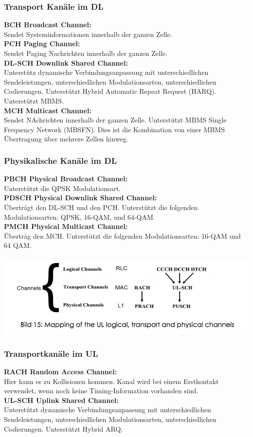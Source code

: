 \subsubsection{Transport Kanäle im DL}
\textbf{BCH Broadcast Channel: } \\
Sendet Systeminformationen innerhalb der ganzen Zelle. \\
\textbf{PCH Paging Channel: } \\
Sendet Paging Nachrichten innerhalb der ganzen Zelle. \\
\textbf{DL-SCH Downlink Shared Channel: } \\
Unterstütz dynamische Verbindungsanpassung mit unterschiedlichen Sendeleistungen, unterschiedlichen Modulationsarten, unterschiedlichen Codierungen. Unterstützt Hybrid Automatic Repeat Request (HARQ). Unterstützt MBMS. \\
\textbf{MCH Multicast Channel: } \\
Sendet NAchrichten innerhalb der ganzen Zelle. Unterstützt MBMS Single Frequency Network (MBSFN). Dies ist die Kombination von einer MBMS Übertragung über mehrere Zellen hinweg. \\
\subsubsection{Physikalische Kanäle im DL}
\textbf{PBCH Physical Broadcast Channel: } \\
Unterstützt die QPSK Modulationsart. \\
\textbf{PDSCH Physical Downlink Shared Channel: } \\
Überträgt den DL-SCH und den PCH. Unterstützt die folgenden Modulationsarten: QPSK, 16-QAM, und 64-QAM. \\
\textbf{PMCH Physical Multicast Channel: } \\
Überträg den MCH. Unterstützt die folgenden Modulationsarten: 16-QAM und 64 QAM. \\ \\
\includegraphics[width = 0.7 \linewidth]{./Pics/Ch2.png}
\subsubsection{Transportkanäle im UL}
\textbf{RACH Random Access Channel: } \\
Hier kann es zu Kollisionen kommen. Kanal wird bei einem Erstkontakt verwendet, wenn noch keine Timing-Information vorhanden sind. \\
\textbf{UL-SCH Uplink Shared Channel: } \\
Unterstützt dynamische Verbindungsanpassung mit unterschiedlichen Sendeleistungen, unterschiedlichen Modulationsarten, unterschiedlichen Codierungen. Unterstützt Hybrid ARQ.\\
